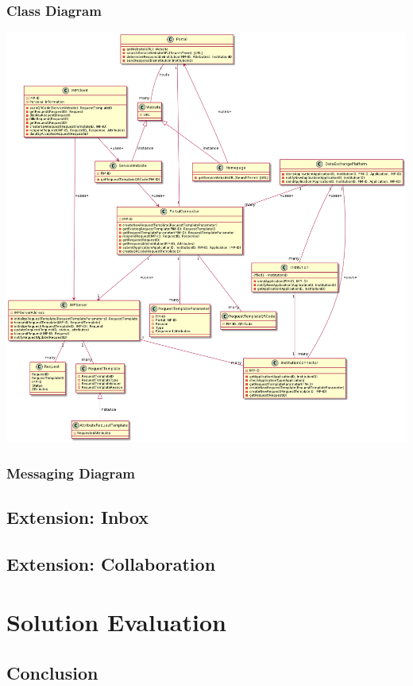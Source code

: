 \documentclass[
     12pt,         %
     a4paper,      %
     BCOR=10mm,version=first,     %
     DIV=14,version=first,        %
     ]{scrreprt}
\begin{document}
\subsection{Class Diagram}

\includegraphics[width=15cm]{Diagrams/out/Class Diagram/Class Diagram.png}

\subsection{Messaging Diagram}

\section{Extension: Inbox}

\section{Extension: Collaboration}

\chapter{Solution Evaluation}

\section{Conclusion}
\end{document}
